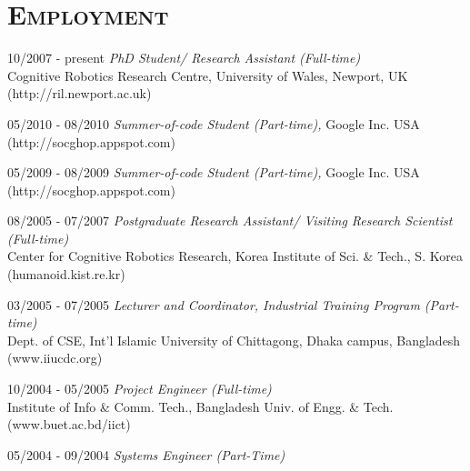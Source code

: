 \documentclass[notopicbreak,contbibnum,plain]{simplecv}
\begin{document}
\section{\textsc{Employment}}
\vspace*{-0.1cm}
\begin{topic}
	\item[10/2007 - present] \textit{PhD Student/ Research Assistant (Full-time)}\\
    Cognitive Robotics Research Centre,
    University of Wales, Newport, UK (\small http://ril.newport.ac.uk)
    \vspace*{-0.1cm}
    \normalsize    
    \item[05/2010 - 08/2010] \textit{Summer-of-code Student (Part-time),}
    Google Inc.  USA (\small http://socghop.appspot.com)
\vspace*{-0.1cm}
 \normalsize 
	    \item[05/2009 - 08/2009] \textit{Summer-of-code Student (Part-time),}
    Google Inc.  USA (\small http://socghop.appspot.com)
\vspace*{-0.1cm}
 \normalsize      
    \item[08/2005 - 07/2007] \textit{Postgraduate Research Assistant/ Visiting Research Scientist (Full-time)\\}
    Center for Cognitive Robotics Research,
    Korea Institute of Sci. \& Tech., S. Korea (\small humanoid.kist.re.kr)
\vspace*{-0.1cm}
 \normalsize 
\item[03/2005 - 07/2005] \textit{Lecturer and Coordinator, Industrial Training Program (Part-time)}\\
	Dept. of CSE, Int'l Islamic University of Chittagong, Dhaka campus, Bangladesh (\small www.iiucdc.org)
\vspace*{-0.1cm}
 \normalsize     
    \item[10/2004 - 05/2005] \textit{Project Engineer (Full-time) }\\
	Institute of Info \& Comm. Tech.,
	Bangladesh Univ. of Engg. \& Tech. (\small www.buet.ac.bd/iict)
\vspace*{-0.1cm}
 \normalsize 
	\item[05/2004 - 09/2004]\textit{ Systems Engineer (Part-Time)}

\end{topic}
\end{document}
